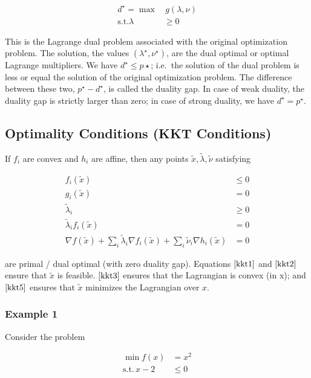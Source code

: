 \begin{align*}
d^\star = \max & \, g(\lambda, \nu) \\
\text{s.t.} \lambda & \geq 0
\end{align*}


This is the Lagrange dual problem associated with the original optimization problem. The solution, the values $(\lambda^\star, \nu^\star)$, are the dual optimal or optimal Lagrange multipliers. We have $d^\star \leq p\star $; i.e.~the solution of the dual problem is less or equal the solution of the original optimization problem. The difference between these two, $p^\star - d^\star $, is called the duality gap. In case of weak duality, the duality gap is strictly larger than zero; in case of strong duality, we have $d^\star = p^\star $.

\subsection{Optimality Conditions (KKT Conditions)}

If $f_i$ are convex and $h_i$ are affine, then any points $\tilde x, \tilde \lambda, \tilde \nu$ satisfying


\begin{align}
\label{kkt1} f_i(\tilde x) & \leq 0 \\
\label{kkt2} g_i(\tilde x) & = 0 \\
\label{kkt3} \tilde \lambda_i & \geq 0 \\
\label{kkt4} \tilde \lambda_i f_i(\tilde x) & = 0 \\
\label{kkt5} \nabla f(\tilde x) + \sum_i \tilde \lambda_i \nabla f_i(\tilde x) + \sum_i \tilde \nu_i \nabla h_i(\tilde x) & = 0
\end{align}


are primal / dual optimal (with zero duality gap). Equations
$\eqref{kkt1}$ and $\eqref{kkt2}$ ensure that $\tilde x$ is feasible. $\eqref{kkt3}$ ensures that the Lagrangian is convex (in x); and $\eqref{kkt5}$ ensures that $\tilde x$ minimizes the Lagrangian over $x$.

\subsubsection{Example 1}

Consider the problem


\begin{align*}
\min f(x) &= x^2 \\
\text{s.t.} \, x-2 & \leq 0
\end{align*}


